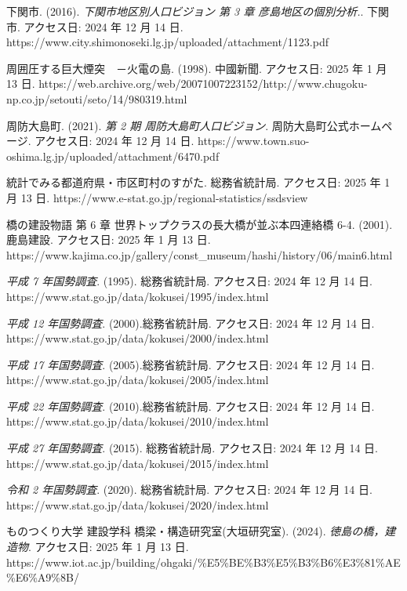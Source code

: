 下関市. (2016). \emph{下関市地区別人口ビジョン 第 3 章
彦島地区の個別分析.}. 下関市. アクセス日: 2024 年 12 月 14 日.
https://www.city.shimonoseki.lg.jp/uploaded/attachment/1123.pdf

周囲圧する巨大煙突　－火電の島. (1998). 中國新聞. アクセス日: 2025 年 1
月 13 日.
https://web.archive.org/web/20071007223152/http://www.chugoku-np.co.jp/setouti/seto/14/980319.html

周防大島町. (2021). \emph{第 2 期 周防大島町人口ビジョン}.
周防大島町公式ホームページ. アクセス日: 2024 年 12 月 14 日.
https://www.town.suo-oshima.lg.jp/uploaded/attachment/6470.pdf

統計でみる都道府県・市区町村のすがた. 総務省統計局. アクセス日: 2025 年
1 月 13 日. https://www.e-stat.go.jp/regional-statistics/ssdsview

橋の建設物語 第 6 章 世界トップクラスの長大橋が並ぶ本四連絡橋 6-4.
(2001). 鹿島建設. アクセス日: 2025 年 1 月 13 日.
https://www.kajima.co.jp/gallery/const\_museum/hashi/history/06/main6.html

\emph{平成 7 年国勢調査}. (1995). 総務省統計局. アクセス日: 2024 年 12
月 14 日. https://www.stat.go.jp/data/kokusei/1995/index.html

\emph{平成 12 年国勢調査}. (2000).総務省統計局. アクセス日: 2024 年 12
月 14 日. https://www.stat.go.jp/data/kokusei/2000/index.html

\emph{平成 17 年国勢調査}. (2005).総務省統計局. アクセス日: 2024 年 12
月 14 日. https://www.stat.go.jp/data/kokusei/2005/index.html

\emph{平成 22 年国勢調査}. (2010).総務省統計局. アクセス日: 2024 年 12
月 14 日. https://www.stat.go.jp/data/kokusei/2010/index.html

\emph{平成 27 年国勢調査}. (2015). 総務省統計局. アクセス日: 2024 年 12
月 14 日. https://www.stat.go.jp/data/kokusei/2015/index.html

\emph{令和 2 年国勢調査}. (2020). 総務省統計局. アクセス日: 2024 年 12
月 14 日. https://www.stat.go.jp/data/kokusei/2020/index.html

ものつくり大学 建設学科 橋梁・構造研究室(大垣研究室). (2024).
\emph{徳島の橋，建造物}. アクセス日: 2025 年 1 月 13 日.
https://www.iot.ac.jp/building/ohgaki/\%E5\%BE\%B3\%E5\%B3\%B6\%E3\%81\%AE\%E6\%A9\%8B/
